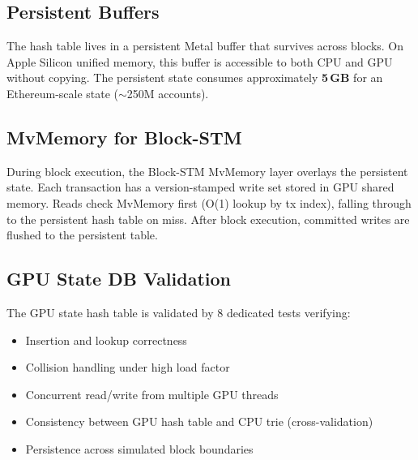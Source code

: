 \subsection{Persistent Buffers}

The hash table lives in a persistent Metal buffer that survives across blocks.
On Apple Silicon unified memory, this buffer is accessible to both CPU and GPU without
copying. The persistent state consumes approximately \textbf{5\,GB} for an Ethereum-scale
state ($\sim$250M accounts).

\subsection{MvMemory for Block-STM}

During block execution, the Block-STM MvMemory layer overlays the persistent state.
Each transaction has a version-stamped write set stored in GPU shared memory. Reads
check MvMemory first (O(1) lookup by tx index), falling through to the persistent hash
table on miss. After block execution, committed writes are flushed to the persistent table.

\subsection{GPU State DB Validation}

The GPU state hash table is validated by 8 dedicated tests verifying:
\begin{itemize}
\item Insertion and lookup correctness
\item Collision handling under high load factor
\item Concurrent read/write from multiple GPU threads
\item Consistency between GPU hash table and CPU trie (cross-validation)
\item Persistence across simulated block boundaries
\end{itemize}


